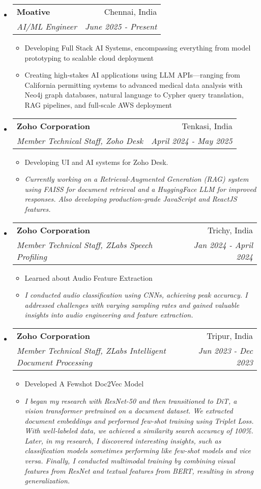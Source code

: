 \documentclass[letterpaper,11pt]{article}
\makeatletter
\newcommand{\resitem}[1]{\item #1 \vspace{-2pt}}
\newcommand{\resheading}[1]{\textbf{\sffamily{\mbox{~}{\large #1} \vphantom{p\^{E}}}}}
\newcommand{\ressubheading}[4]{
\begin{tabular*}{6.5in}{l@{\extracolsep{\fill}}r}
    \textbf{#1} & #2 \\
    \textit{#3} & \textit{#4} \\
\end{tabular*}\vspace{-4pt}} %
\makeatother
\begin{document}
\resheading{Work Experience}
\begin{itemize}
\item[]
    \ressubheading{Moative}{Chennai, India}{AI/ML Engineer}{June 2025 - Present}
    \begin{itemize}
        \resitem{Developing Full Stack AI Systems, encompassing everything from model prototyping to scalable cloud deployment}
        \resitem{Creating high-stakes AI applications using LLM APIs—ranging from California permitting systems to advanced medical data analysis with Neo4j graph databases, natural language to Cypher query translation, RAG pipelines, and full-scale AWS deployment}
    \end{itemize}
\item[]
    \ressubheading{Zoho Corporation}{Tenkasi, India}{Member Technical Staff, Zoho Desk}{April 2024 - May 2025}
    \begin{itemize}
        \resitem{Developing UI and AI systems for Zoho Desk.}
        \resitem{\textit{Currently working on a Retrieval-Augmented Generation (RAG) system using FAISS for document retrieval and a HuggingFace LLM for improved responses. Also developing production-grade JavaScript and ReactJS features.}}
    \end{itemize}
\item[]
	\ressubheading{Zoho Corporation}{Trichy, India}{Member Technical Staff, ZLabs Speech Profiling}{Jan 2024 - April 2024}
	\begin{itemize}
		\resitem{Learned about Audio Feature Extraction}
		\resitem{\textit{I conducted audio classification using CNNs, achieving peak accuracy. I addressed challenges with varying sampling rates and gained valuable insights into audio engineering and feature extraction.}}
	\end{itemize}
	
\item[]
	\ressubheading{Zoho Corporation}{Tripur, India}{Member Technical Staff, ZLabs Intelligent Document Processing}{Jun 2023 - Dec 2023}
	\begin{itemize}
		\resitem{Developed A Fewshot Doc2Vec Model}
		\resitem{\textit{I began my research with ResNet-50 and then transitioned to DiT, a vision transformer pretrained on a document dataset. We extracted document embeddings and performed few-shot training using Triplet Loss. With well-labeled data, we achieved a similarity search accuracy of 100\%. Later, in my research, I discovered interesting insights, such as classification models sometimes performing like few-shot models and vice versa. Finally, I conducted multimodal training by combining visual features from ResNet and textual features from BERT, resulting in strong generalization.}}
	\end{itemize}


\end{itemize}
\end{document}
